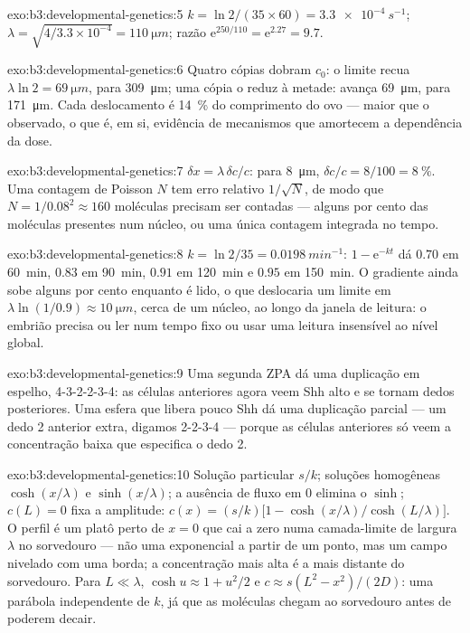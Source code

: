 \begin{solution}{exo:b3:developmental-genetics:5}
$k = \ln 2/(35\times 60) = \qty{3.3e-4}{s^{-1}}$; $\lambda = \sqrt{4/
3.3\times 10^{-4}} = \qty{110}{\micro m}$; razão $\mathrm{e}^{250/110}
= \mathrm{e}^{2.27} = 9.7$.
\end{solution}

\begin{solution}{exo:b3:developmental-genetics:6}
Quatro cópias dobram $c_{0}$: o limite recua $\lambda\ln 2 =
\qty{69}{\micro m}$, para \qty{309}{\micro m}; uma cópia o reduz à
metade: avança \qty{69}{\micro m}, para \qty{171}{\micro m}. Cada
deslocamento é \qty{14}{\%} do comprimento do ovo --- maior que o
observado, o que é, em si, evidência de mecanismos que amortecem a
dependência da dose.
\end{solution}

\begin{solution}{exo:b3:developmental-genetics:7}
$\delta x = \lambda\,\delta c/c$: para \qty{8}{\micro m}, $\delta c/c =
8/100 = \qty{8}{\%}$. Uma contagem de Poisson $N$ tem erro relativo
$1/\sqrt{N}$, de modo que $N = 1/0.08^{2} \approx 160$ moléculas
precisam ser contadas --- alguns por cento das moléculas presentes num
núcleo, ou uma única contagem integrada no tempo.
\end{solution}

\begin{solution}{exo:b3:developmental-genetics:8}
$k = \ln 2/35 = \qty{0.0198}{min^{-1}}$: $1 - \mathrm{e}^{-kt}$ dá
$0.70$ em \qty{60}{min}, $0.83$ em \qty{90}{min}, $0.91$ em
\qty{120}{min} e $0.95$ em \qty{150}{min}. O gradiente ainda sobe
alguns por cento enquanto é lido, o que deslocaria um limite em
$\lambda\ln(1/0.9) \approx \qty{10}{\micro m}$, cerca de um núcleo, ao
longo da janela de leitura: o embrião precisa ou ler num tempo fixo ou
usar uma leitura insensível ao nível global.
\end{solution}

\begin{solution}{exo:b3:developmental-genetics:9}
Uma segunda ZPA dá uma duplicação em espelho, 4-3-2-2-3-4: as células
anteriores agora veem Shh alto e se tornam dedos posteriores. Uma esfera
que libera pouco Shh dá uma duplicação parcial --- um dedo 2 anterior
extra, digamos 2-2-3-4 --- porque as células anteriores só veem a
concentração baixa que especifica o dedo 2.
\end{solution}

\begin{solution}{exo:b3:developmental-genetics:10}
Solução particular $s/k$; soluções homogêneas $\cosh(x/\lambda)$ e
$\sinh(x/\lambda)$; a ausência de fluxo em $0$ elimina o $\sinh$; $c(L) = 0$ fixa a amplitude: $c(x) = (s/k)\bigl[1 - \cosh(x/\lambda)/\cosh(L/\lambda)\bigr]$.
O perfil é um platô perto de $x = 0$ que cai a zero numa camada-limite de
largura $\lambda$ no sorvedouro --- não uma exponencial a partir de um
ponto, mas um campo nivelado com uma borda; a concentração mais alta é a
mais distante do sorvedouro. Para $L \ll \lambda$, $\cosh u \approx 1 +
u^{2}/2$ e $c \approx s(L^{2} - x^{2})/(2D)$: uma parábola independente
de $k$, já que as moléculas chegam ao sorvedouro antes de poderem decair.
\end{solution}

